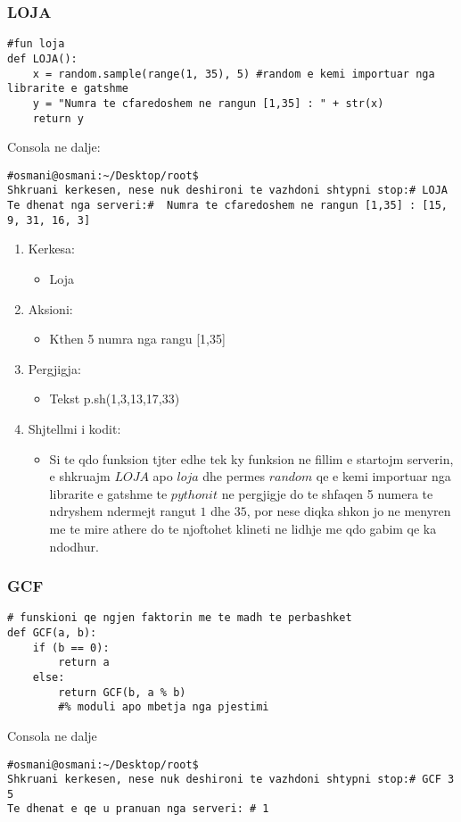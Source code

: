 \documentclass[]{article}
\begin{document}
\subsubsection{LOJA}
\begin{lstlisting}
#fun loja
def LOJA():
    x = random.sample(range(1, 35), 5) #random e kemi importuar nga librarite e gatshme
    y = "Numra te cfaredoshem ne rangun [1,35] : " + str(x)
    return y
\end{lstlisting}
\vspace*{1cm}
\noindent Consola ne dalje:
\begin{lstlisting}
#osmani@osmani:~/Desktop/root$
Shkruani kerkesen, nese nuk deshironi te vazhdoni shtypni stop:# LOJA
Te dhenat nga serveri:#  Numra te cfaredoshem ne rangun [1,35] : [15, 9, 31, 16, 3]

\end{lstlisting}

\begin{enumerate}
\item Kerkesa:
\begin{itemize}
\item Loja
\end{itemize}
\item Aksioni:
\begin{itemize}
\item Kthen 5 numra nga rangu [1,35]
\end{itemize}
\item Pergjigja:
\begin{itemize}
\item Tekst p.sh(1,3,13,17,33)
\end{itemize}
\item Shjtellmi i kodit:
\begin{itemize}
\item Si te qdo funksion tjter edhe tek ky funksion ne fillim e startojm serverin, e shkruajm $LOJA$ apo $loja$ dhe permes $random$ qe e kemi importuar nga librarite e gatshme te $pythonit$ ne pergjigje do te shfaqen 5 numera te ndryshem ndermejt rangut $1$ dhe $35$, por nese diqka shkon jo ne menyren me te mire athere do te njoftohet klineti ne lidhje me qdo gabim qe ka ndodhur.


\end{itemize}
\end{enumerate}
\newpage
\subsubsection{GCF}
\begin{lstlisting}
# funskioni qe ngjen faktorin me te madh te perbashket
def GCF(a, b):
    if (b == 0):
        return a
    else:
        return GCF(b, a % b) 
        #% moduli apo mbetja nga pjestimi 
\end{lstlisting}
\vspace*{1cm}
\noindent Consola ne dalje
\begin{lstlisting}
#osmani@osmani:~/Desktop/root$
Shkruani kerkesen, nese nuk deshironi te vazhdoni shtypni stop:# GCF 3 5
Te dhenat e qe u pranuan nga serveri: # 1


\end{lstlisting}
\end{document}
